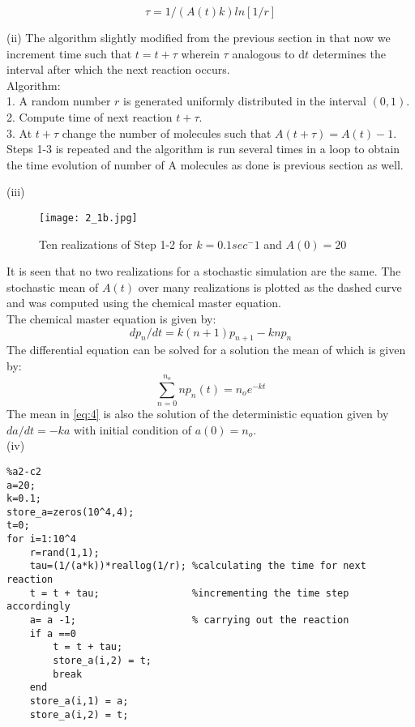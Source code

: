 \documentclass[10 pt]{article}
\begin{document}
\begin{multicols}{2}
\begin{flushleft}
\begin{equation}
\tau=1/(A(t)k)ln[1/r]
\end{equation} 
\end{flushleft}
\begin{flushleft}
(ii)
The algorithm slightly modified from the previous section in that now we increment time such that $t=t+\tau$ wherein $\tau$ analogous to d$t$ determines the interval after which the next reaction occurs.\\
Algorithm:\\
1. A random number $r$ is generated uniformly distributed in the interval $(0,1)$.\\
2. Compute time of next reaction $t+\tau$.\\
3. At $t+\tau$ change the number of molecules such that $A(t+\tau) = A(t)-1$.\\

Steps 1-3 is repeated and the algorithm is run several times in a loop to obtain the time evolution of number of A molecules as done is previous section as well.
\end{flushleft}
\begin{flushleft}


(iii)\begin{figure}[H]
\centerline{\texttt{[image: 2\_1b.jpg]}}
\caption{Ten realizations of Step 1-2 for $k=0.1 sec^-1$ and $A(0)=20$}
\label{2}
\end{figure}
It is seen that no two realizations for a stochastic simulation are the same. The stochastic mean of $A(t)$ over many realizations is plotted as the dashed curve and was computed using the chemical master equation.\\
The chemical master equation is given by:\\
\begin{equation}
dp_n/dt = k(n+1)p_{n+1}-knp_n
\end{equation}
The differential equation can be solved for a solution the mean of which is given by:\\
\begin{equation}\label{eq:4}
\displaystyle\sum_{n=0}^{n_o} np_n(t) = n_oe^{-kt}
\end{equation}
The mean in \ref{eq:4} is also the solution of the deterministic equation given by $da/dt = -ka $ with initial condition of $a(0)=n_o$.\\
(iv)\begin{lstlisting}
%a2-c2
a=20;
k=0.1;
store_a=zeros(10^4,4);
t=0;
for i=1:10^4
    r=rand(1,1);
    tau=(1/(a*k))*reallog(1/r); %calculating the time for next reaction
    t = t + tau;				%incrementing the time step accordingly
    a= a -1;					% carrying out the reaction
    if a ==0
        t = t + tau;
        store_a(i,2) = t;
        break
    end
    store_a(i,1) = a;
    store_a(i,2) = t;
    

\end{lstlisting}
\end{flushleft}
\end{multicols}
\end{document}
